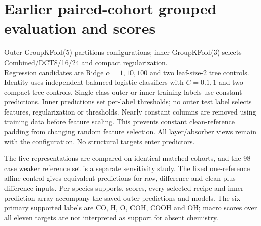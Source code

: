 \documentclass[11pt,a4paper]{article}
\begin{document}
\section{Earlier paired-cohort grouped evaluation and scores}
\begin{sloppypar}
Outer GroupKFold(5) partitions configurations; inner GroupKFold(3) selects Combined/DCT8/16/24 and compact regularization.\\ Regression candidates are Ridge $\alpha=1,10,100$ and two leaf-size-2 tree controls. Identity uses independent balanced logistic classifiers with $C=0.1,1$ and two compact tree controls. Single-class outer or inner training labels use constant predictions. Inner predictions set per-label thresholds; no outer test label selects features, regularization or thresholds. Nearly constant columns are removed using training data before feature scaling. This prevents constant clean-reference padding from changing random feature selection. All layer/absorber views remain with the configuration. No structural targets enter predictors.
\end{sloppypar}

The five representations are compared on identical matched cohorts, and the 98-case weaker reference set is a separate sensitivity study. The fixed one-reference affine control gives equivalent predictions for raw, difference and clean-plus-difference inputs. Per-species supports, scores, every selected recipe and inner prediction array accompany the saved outer predictions and models. The six primary supported labels are CO, H, O, COH, COOH and OH; macro scores over all eleven targets are not interpreted as support for absent chemistry.
\end{document}
